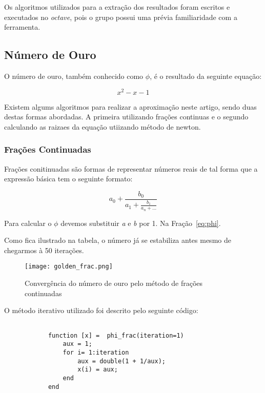 	Os algoritmos utilizados para a extração dos resultados foram escritos e
	executados no \emph{octave}, pois o grupo possui uma prévia familiaridade
	com a ferramenta. 
	
	\subsection{Número de Ouro}

		O número de ouro, também conhecido como $\phi$, é o resultado da
		seguinte equação:

		\begin{equation}
			x^2-x-1
		\end{equation}

		Existem algums algoritmos para realizar a aproximação neste artigo,
		sendo duas destas formas  abordadas. A primeira utilizando frações
		continuas e o segundo calculando as raizaes da equação utiizando método
		de newton.

		\subsubsection{Frações Continuadas}

			Frações conitinuadas são formas de representar números reais de tal
			forma que a expressão básica tem o seguinte formato:

			\begin{equation}\label{eq:phi}
				a_0 + \frac{b_0}{a_1 + \frac{b_1}{a_n + \dots}}
			\end{equation}

			Para calcular o $\phi$ devemos substituir \emph{a} e \emph{b} por 1.
			Na Fração~\ref{eq:phi}.

			

			Como fica ilustrado na tabela, o número já se estabiliza antes mesmo
			de chegarmos à 50 iterações.

			\begin{figure}[H]
				\centering
				\texttt{[image: golden\_frac.png]}
				\caption{Convergência do número de ouro pelo método de frações continuadas}
				\label{golden_frac}
			\end{figure}


			O método iterativo utilizado foi descrito pelo seguinte código:

			\begin{lstlisting}

			function [x] =  phi_frac(iteration=1)
				aux = 1;
				for i= 1:iteration
					aux = double(1 + 1/aux);
					x(i) = aux;
				end
			end

			\end{lstlisting}

